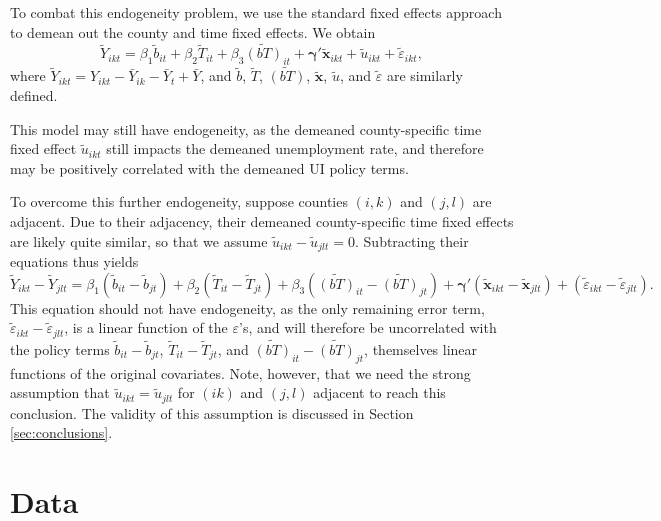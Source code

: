 \documentclass[12pt]{article}
\begin{document}
To combat this endogeneity problem, we use the standard fixed effects approach to demean out the county and time fixed effects. We obtain
\begin{equation} \label{eq:county}
\widetilde{Y}_{ikt} = \beta_1 \widetilde{b}_{it} + \beta_2 \widetilde{T}_{it} + \beta_3 \widetilde{(bT)}_{it} + \boldsymbol{\gamma}'\widetilde{\mathbf{x}}_{ikt} + \widetilde{u}_{ikt} + \widetilde{\varepsilon}_{ikt},
\end{equation}
where $\widetilde{Y}_{ikt} = Y_{ikt} - \bar{Y}_{ik} - \bar{Y}_{t} + \bar{Y}$, and $\widetilde{b}$, $\widetilde{T}$, $\widetilde{(bT)}$, $\widetilde{\mathbf{x}}$, $\widetilde{u}$, and $\widetilde{\varepsilon}$ are similarly defined.

This model may still have endogeneity, as the demeaned county-specific time fixed effect $\widetilde{u}_{ikt}$ still impacts the demeaned unemployment rate, and therefore may be positively correlated with the demeaned UI policy terms. 

To overcome this further endogeneity, suppose counties $(i,k)$ and $(j,l)$ are adjacent. Due to their adjacency, their demeaned county-specific time fixed effects are likely quite similar, so that we assume $\widetilde{u}_{ikt} - \widetilde{u}_{jlt} = 0$. Subtracting their equations thus yields
\begin{equation} \label{eq:pair}
	\widetilde{Y}_{ikt} - \widetilde{Y}_{jlt} = \beta_1 (\widetilde{b}_{it}-\widetilde{b}_{jt}) + \beta_2 (\widetilde{T}_{it}-\widetilde{T}_{jt}) + \beta_3 \left(\widetilde{(bT)}_{it} - \widetilde{(bT)}_{jt}\right) + \boldsymbol{\gamma}'(\widetilde{\mathbf{x}}_{ikt}-\widetilde{\mathbf{x}}_{jlt}) + (\widetilde{\varepsilon}_{ikt} - \widetilde{\varepsilon}_{jlt}).
\end{equation}
This equation should not have endogeneity, as the only remaining error term, $\widetilde{\varepsilon}_{ikt} - \widetilde{\varepsilon}_{jlt}$, is a linear function of the $\varepsilon$'s, and will therefore be uncorrelated with the policy terms $\widetilde{b}_{it}-\widetilde{b}_{jt}$, $\widetilde{T}_{it}-\widetilde{T}_{jt}$, and $\widetilde{(bT)}_{it} - \widetilde{(bT)}_{jt}$, themselves linear functions of the original covariates. Note, however, that we need the strong assumption that $\widetilde{u}_{ikt} = \widetilde{u}_{jlt}$ for $(ik)$ and $(j,l)$ adjacent to reach this conclusion. The validity of this assumption is discussed in Section \ref{sec:conclusions}.


\section{Data \label{sec:data}} 
\end{document}
